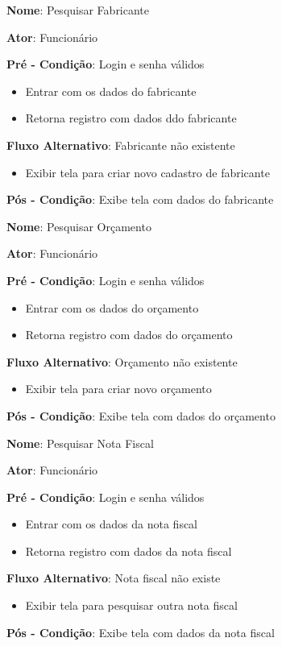 \documentclass[a4paper,10pt]{article}
\begin{document}
\begin{framed}
\textbf{Nome}: Pesquisar Fabricante

\textbf{Ator}: Funcionário

\textbf{Pré - Condição}: Login e senha válidos

\begin{itemize}
\item Entrar com os dados do fabricante
\item Retorna registro com dados ddo fabricante
\end{itemize}
\textbf{Fluxo Alternativo}: Fabricante não existente
\begin{itemize}
\item Exibir tela para criar novo cadastro de fabricante
\end{itemize}
\textbf{Pós - Condição}: Exibe tela com dados do fabricante 
\end{framed}

\begin{framed}
\textbf{Nome}: Pesquisar Orçamento

\textbf{Ator}: Funcionário

\textbf{Pré - Condição}: Login e senha válidos
\begin{itemize}
\item Entrar com os dados do orçamento
\item Retorna registro com dados do orçamento
\end{itemize}
\textbf{Fluxo Alternativo}: Orçamento não existente
\begin{itemize}
\item Exibir tela para criar novo orçamento
\end{itemize}
\textbf{Pós - Condição}: Exibe tela com dados do orçamento
\end{framed}

\begin{framed}
\textbf{Nome}: Pesquisar Nota Fiscal

\textbf{Ator}: Funcionário

\textbf{Pré - Condição}: Login e senha válidos
\begin{itemize}
\item Entrar com os dados da nota fiscal
\item Retorna registro com dados da nota fiscal
\end{itemize}
\textbf{Fluxo Alternativo}: Nota fiscal não existe
\begin{itemize}
\item Exibir tela para pesquisar outra nota fiscal
\end{itemize}
\textbf{Pós - Condição}: Exibe tela com dados da nota fiscal
\end{framed}
\end{document}
